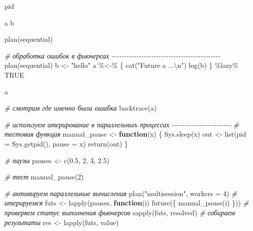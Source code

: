\documentclass[
]{book}
\newenvironment{Shaded}{\begin{snugshade}}{\end{snugshade}}
\newcommand{\AttributeTok}[1]{\textcolor[rgb]{0.77,0.63,0.00}{#1}}
\newcommand{\CommentTok}[1]{\textcolor[rgb]{0.56,0.35,0.01}{\textit{#1}}}
\newcommand{\ConstantTok}[1]{\textcolor[rgb]{0.00,0.00,0.00}{#1}}
\newcommand{\ControlFlowTok}[1]{\textcolor[rgb]{0.13,0.29,0.53}{\textbf{#1}}}
\newcommand{\DecValTok}[1]{\textcolor[rgb]{0.00,0.00,0.81}{#1}}
\newcommand{\FloatTok}[1]{\textcolor[rgb]{0.00,0.00,0.81}{#1}}
\newcommand{\FunctionTok}[1]{\textcolor[rgb]{0.00,0.00,0.00}{#1}}
\newcommand{\NormalTok}[1]{#1}
\newcommand{\OtherTok}[1]{\textcolor[rgb]{0.56,0.35,0.01}{#1}}
\newcommand{\SpecialCharTok}[1]{\textcolor[rgb]{0.00,0.00,0.00}{#1}}
\newcommand{\StringTok}[1]{\textcolor[rgb]{0.31,0.60,0.02}{#1}}
\begin{document}
\begin{Shaded}
\begin{Highlighting}[]
\NormalTok{pid}

\NormalTok{a}
\NormalTok{b}

\FunctionTok{plan}\NormalTok{(sequential)}


\CommentTok{\# обработка ошибок в фьючерсах {-}{-}{-}{-}{-}{-}{-}{-}{-}{-}{-}{-}{-}{-}{-}{-}{-}{-}{-}{-}{-}{-}{-}{-}{-}{-}{-}{-}{-}{-}{-}{-}{-}{-}{-}{-}{-}{-}{-}{-}{-}{-}{-}{-}}
\FunctionTok{plan}\NormalTok{(sequential)}
\NormalTok{b }\OtherTok{\textless{}{-}} \StringTok{"hello"}
\NormalTok{a }\SpecialCharTok{\%\textless{}{-}\%}\NormalTok{ \{}
  \FunctionTok{cat}\NormalTok{(}\StringTok{"Future \textquotesingle{}a\textquotesingle{} ...}\SpecialCharTok{\textbackslash{}n}\StringTok{"}\NormalTok{)}
  \FunctionTok{log}\NormalTok{(b)}
\NormalTok{  \} }\SpecialCharTok{\%lazy\%} \ConstantTok{TRUE}

\NormalTok{a}

\CommentTok{\# смотрим где именно была ошибка}
\FunctionTok{backtrace}\NormalTok{(a)}

\CommentTok{\# используем итерирование в параллельныъ процессах {-}{-}{-}{-}{-}{-}{-}{-}{-}{-}{-}{-}{-}{-}{-}{-}{-}{-}{-}{-}{-}{-}{-}{-}}
\CommentTok{\# тестовая функция}
\NormalTok{manual\_pause }\OtherTok{\textless{}{-}} \ControlFlowTok{function}\NormalTok{(x) \{}
  \FunctionTok{Sys.sleep}\NormalTok{(x)}
\NormalTok{  out }\OtherTok{\textless{}{-}} \FunctionTok{list}\NormalTok{(}\AttributeTok{pid =} \FunctionTok{Sys.getpid}\NormalTok{(), }\AttributeTok{pause =}\NormalTok{ x)}
  \FunctionTok{return}\NormalTok{(out)}
\NormalTok{\} }

\CommentTok{\# паузы}
\NormalTok{pauses }\OtherTok{\textless{}{-}} \FunctionTok{c}\NormalTok{(}\FloatTok{0.5}\NormalTok{, }\DecValTok{2}\NormalTok{, }\DecValTok{3}\NormalTok{, }\FloatTok{2.5}\NormalTok{) }

\CommentTok{\# тест}
\FunctionTok{manual\_pause}\NormalTok{(}\DecValTok{2}\NormalTok{)}

\CommentTok{\# активируем параллельные вычисления}
\FunctionTok{plan}\NormalTok{(}\StringTok{"multisession"}\NormalTok{, }\AttributeTok{workers =} \DecValTok{4}\NormalTok{)}
\CommentTok{\# итерируемся}
\NormalTok{futs }\OtherTok{\textless{}{-}} \FunctionTok{lapply}\NormalTok{(pauses, }\ControlFlowTok{function}\NormalTok{(i) }\FunctionTok{future}\NormalTok{(\{ }\FunctionTok{manual\_pause}\NormalTok{(i) \}))}
\CommentTok{\# проверяем статус выполнения фьючерсов}
\FunctionTok{sapply}\NormalTok{(futs, resolved) }
\CommentTok{\# собираем результаты}
\NormalTok{res }\OtherTok{\textless{}{-}} \FunctionTok{lapply}\NormalTok{(futs, value)    }


\end{Highlighting}
\end{Shaded}
\end{document}
